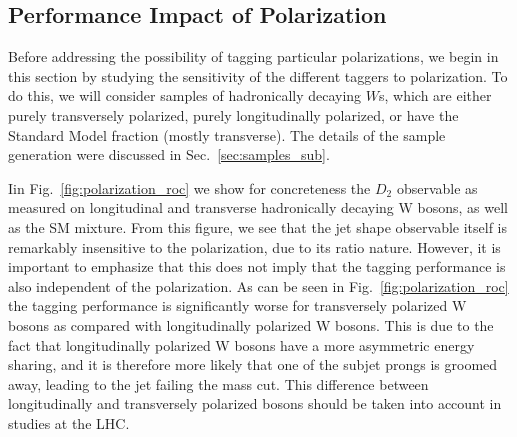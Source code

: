 \documentclass[11pt,letterpaper]{article}
\DeclareRobustCommand{\Sec}[1]{Sec.~\ref{#1}}
\DeclareRobustCommand{\Fig}[1]{Fig.~\ref{#1}}
\begin{document}
\subsection{Performance Impact of Polarization}\label{sec:polar_robust}


Before addressing the possibility of tagging particular polarizations, we begin in this section by studying the sensitivity of the different taggers to polarization. To do this, we will consider samples of hadronically decaying $W$s, which are either purely transversely polarized, purely longitudinally polarized, or have the Standard Model fraction (mostly transverse). The details of the sample generation were discussed in \Sec{sec:samples_sub}.

Iin \Fig{fig:polarization_roc} we show for concreteness the $D_2$ observable as measured on longitudinal and transverse hadronically decaying W bosons, as well as the SM mixture. From this figure, we see that the jet shape observable itself is remarkably insensitive to the polarization, due to its ratio nature. However, it is important to emphasize that this does not imply that the tagging performance is also independent of the polarization. As can be seen in \Fig{fig:polarization_roc} the tagging performance is significantly worse for transversely polarized W bosons as compared with longitudinally polarized W bosons. This is due to the fact that longitudinally polarized W bosons have a more asymmetric energy sharing, and it is therefore more likely that one of the subjet prongs is groomed away, leading to the jet failing the mass cut. This difference between longitudinally and transversely polarized bosons should be taken into account in studies at the LHC.




\end{document}
